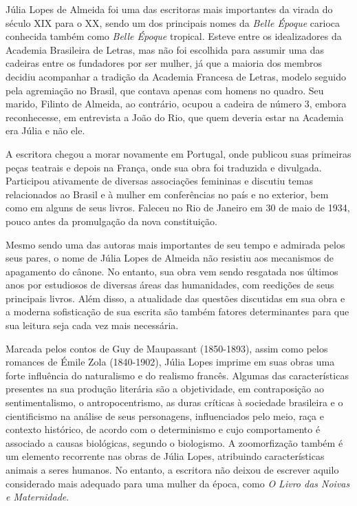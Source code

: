 \documentclass[12pt]{extarticle}
\begin{document}
Júlia Lopes de Almeida foi uma das escritoras mais importantes da virada
do século XIX para o XX, sendo um dos principais nomes da \emph{Belle
Époque} carioca conhecida também como \emph{Belle Époque} tropical.
Esteve entre os idealizadores da Academia Brasileira de Letras, mas não
foi escolhida para assumir uma das cadeiras entre os fundadores por ser
mulher, já que a maioria dos membros decidiu acompanhar a tradição da
Academia Francesa de Letras, modelo seguido pela agremiação no Brasil,
que contava apenas com homens no quadro. Seu marido, Filinto de Almeida,
ao contrário, ocupou a cadeira de número 3, embora reconhecesse, em
entrevista a João do Rio, que quem deveria estar na Academia era Júlia
e não ele.




A escritora chegou a morar novamente em Portugal, onde publicou suas
primeiras peças teatrais e depois na França, onde sua obra foi
traduzida e divulgada. Participou ativamente de diversas associações
femininas e discutiu temas relacionados ao Brasil e à mulher em
conferências no país e no exterior, bem como em alguns de seus livros.
Faleceu no Rio de Janeiro em 30 de maio de 1934, pouco antes da
promulgação da nova constituição.

Mesmo sendo uma das autoras mais importantes de seu tempo e admirada
pelos seus pares, o nome de Júlia Lopes de Almeida não resistiu aos
mecanismos de apagamento do cânone. No entanto, sua obra vem sendo
resgatada nos últimos anos por estudiosos de diversas áreas das
humanidades, com reedições de seus principais livros. Além disso, a
atualidade das questões discutidas em sua obra e a moderna sofisticação
de sua escrita são também fatores determinantes para que sua leitura
seja cada vez mais necessária.




Marcada pelos contos de Guy de Maupassant (1850-1893), assim como pelos
romances de Émile Zola (1840-1902), Júlia Lopes imprime em suas obras
uma forte influência do naturalismo e do realismo francês. Algumas das
características presentes na sua produção literária são a objetividade,
em contraposição ao sentimentalismo, o antropocentrismo, as duras
críticas à sociedade brasileira e o cientificismo na análise de seus
personagens, influenciados pelo meio, raça e contexto histórico, de
acordo com o determinismo e cujo comportamento é associado a causas
biológicas, segundo o biologismo. A zoomorfização também é um elemento
recorrente nas obras de Júlia Lopes, atribuindo características animais
a seres humanos. No entanto, a escritora não deixou de escrever aquilo
considerado mais adequado para uma mulher da época, como \emph{O Livro
das Noivas e Maternidade}.
\end{document}
